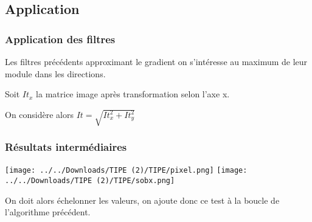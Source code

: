 \documentclass{beamer}
\begin{document}
\subsection{Application}
\begin{frame}[fragile]
\frametitle{Application des filtres}

Les filtres précédents approximant le gradient on s'intéresse au maximum de leur module dans les directions.

Soit $It_x$ la matrice image après transformation selon l'axe x.

On considère alors $It = \sqrt{It_x^2 + It_y^2}$
\begin{center}
\end{center}
\end{frame}

\begin{frame}
\frametitle{Résultats intermédiaires}
\begin{center}
\texttt{[image: ../../Downloads/TIPE (2)/TIPE/pixel.png]} \texttt{[image: ../../Downloads/TIPE (2)/TIPE/sobx.png]}
\end{center}

On doit alors échelonner les valeurs, on ajoute donc ce test à la boucle de l'algorithme précédent.
\begin{center}
\end{center}

\end{frame}
\end{document}
